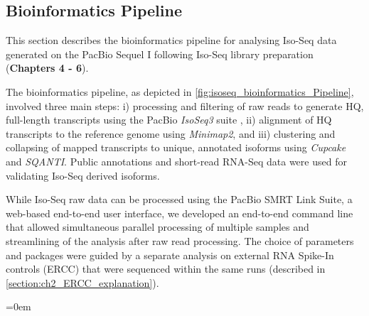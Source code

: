 \clearpage
\subsection{Bioinformatics Pipeline} 
\label{section:isoseq_bioinformatics}
This section describes the bioinformatics pipeline for analysing Iso-Seq data generated on the PacBio Sequel I following Iso-Seq library preparation (\textbf{Chapters 4 - 6}). 

The bioinformatics pipeline, as depicted in \cref{fig:isoseq_bioinformatics_Pipeline}, involved three main steps: i) processing and filtering of raw reads to generate HQ, full-length transcripts using the PacBio \textit{IsoSeq3} suite \cite{Gordon2015}, ii) alignment of HQ transcripts to the reference genome using \textit{Minimap2}\cite{Li2018}, and iii) clustering and collapsing of mapped transcripts to unique, annotated isoforms using \textit{Cupcake}\cite{TsengCupcake} and \textit{SQANTI}\cite{Tardaguila2018}. Public annotations and short-read RNA-Seq data were used for validating Iso-Seq derived isoforms. 

While Iso-Seq raw data can be processed using the PacBio SMRT Link Suite, a web-based end-to-end user interface, we developed an end-to-end command line that allowed simultaneous parallel processing of multiple samples and streamlining of the analysis after raw read processing. The choice of parameters and packages were guided by a separate analysis on external RNA Spike-In controls (ERCC) that were sequenced within the same runs (described in \cref{section:ch2_ERCC_explanation}). 

\begingroup
\parindent=0em
\localtableofcontents 
\endgroup


